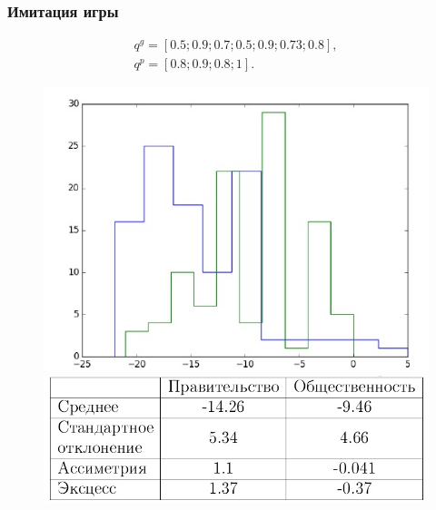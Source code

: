 \documentclass {beamer}
\begin{document}
\begin{frame}
	\frametitle{Имитация игры}
	
	 \begin{gather*}
	 q^g = \left[ 0.5; 0.9; 0.7; 0.5; 0.9; 0.73; 0.8 \right], \\
	 q^p = \left[ 0.8; 0.9; 0.8; 1 \right].
	 \end{gather*}
	 \begin{figure}
	 	\begin{minipage}[b]{0.45\textwidth}
	 		
	 	\includegraphics[width=\textwidth]{government1}
	 \end{minipage}
	 \begin{minipage}[b]{0.45\textwidth}
	 	
	 	\includegraphics[width=\textwidth]{third}
	 \end{minipage}
	 
	 \end{figure}


\end{frame}
\end{document}
